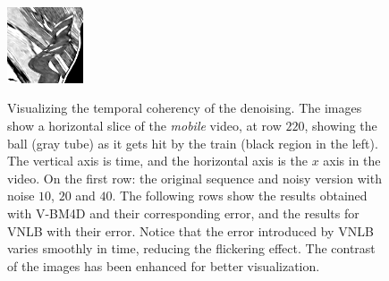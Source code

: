 \documentclass[10pt, journal, twocolumn, final, a4paper]{IEEEtran}
\begin{document}
\begin{figure}[thpb!]
\begin{center}
		\includegraphics[width=0.2\textwidth]{figs/temporal_slices/slice_mobile_mono_vnlb_pt4_s40_row220_col040-180_fra080-220_neg-weights.png}\\
	\end{center}
	\caption{Visualizing the temporal coherency of the denoising. The images
		show a horizontal slice of the \emph{mobile} video, at row $220$, showing
		the ball (gray tube) as it gets hit by the train (black region in the
		left). The vertical axis is time, and the horizontal axis is the $x$ axis
		in the video. On the first row: the original sequence and noisy version with
		noise $10$, $20$ and $40$. The following rows show the results obtained
		with V-BM4D and their corresponding error, and the results for VNLB with their
		error. Notice that the error introduced by VNLB varies smoothly in time, reducing
		the flickering effect. The contrast of the images has been enhanced for
		better visualization.
} \label{fig:time-diff}
\end{figure}
\end{document}
